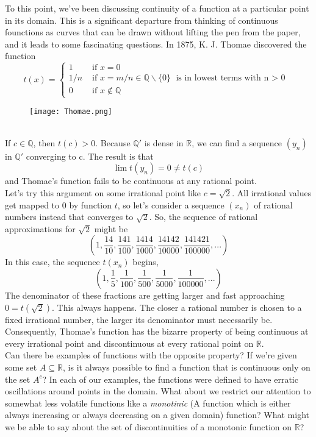 \quad To this point, we've been discussing continuity of a function at a particular point in its domain. This is a significant departure from thinking of continuous founctions as curves that can be drawn without lifting the pen from the paper, and it leads to some fascinating questions. In 1875, K. J. Thomae discovered the function
\begin{equation*}
    t(x) = 
    \begin{cases}
        1 & \text{ if } x = 0 \\
        1/n & \text{ if } x = m/n \in \mathbb{Q}\backslash \{0\} \text{ is in lowest terms with n $>$ 0 } \\
        0 & \text{ if } x \notin \mathbb{Q}
    \end{cases}
\end{equation*}
\begin{figure}[ht]
    \centering
    \texttt{[image: Thomae.png]}
\end{figure} \\
If $c \in \mathbb{Q}$, then $t(c) > 0$. Because $\mathbb{Q}'$ is dense in $\mathbb{R}$, we can find a sequence $(y_n)$ in $\mathbb{Q}'$ converging to c. The result is that \[
    \lim t(y_n) = 0 \neq t(c)
\]
and Thomae's function fails to be continuous at any rational point.\\
Let's try this argument on some irrational point like $c=\sqrt{2}$. All irrational values get mapped to $0$ by function $t$, so let's consider a sequence $(x_n)$ of rational numbers instead that converges to $\sqrt{2}$. So, the sequence of rational approximations for $\sqrt{2}$ might be \[
    \left( 1, \frac{14}{10}, \frac{141}{100}, \frac{1414}{1000}, \frac{14142}{10000}, \frac{141421}{100000}, ... \right)
\]
In this case, the sequence $t(x_n)$ begins, \[
    \left( 1, \frac{1}{5}, \frac{1}{100}, \frac{1}{500}, \frac{1}{5000}, \frac{1}{100000}, ... \right)
\]
The denominator of these fractions are getting larger and fast approaching $0 = t(\sqrt{2})$. This always happens. The closer a rational number is chosen to a fixed irrational number, the larger its denominator must necessarily be. Consequently, Thomae's function has the bizarre property of being continuous at every irrational point and discontinuous at every rational point on $\mathbb{R}$. \\

\quad Can there be examples of functions with the opposite property? If we're given some set $A \subseteq \mathbb{R}$, is it always possible to find a function that is continuous only on the set $A^c$? In each of our examples, the functions were defined to have erratic oscillations around points in the domain. What about we restrict our attention to somewhat less volatile functions like a \textit{monotinic} (A function which is either always increasing or always decreasing on a given domain) function? What might we be able to say about the set of discontinuities of a monotonic function on $\mathbb{R}$? \\~\\



